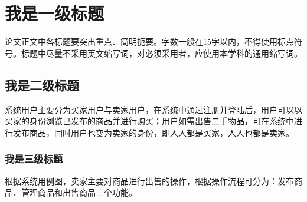 
\chapter{我是一级标题}
论文正文中各标题要突出重点、简明扼要。字数一般在15字以内，不得使用标点符号。标题中尽量不采用英文缩写词，对必须采用者，应使用本学科的通用缩写词。

\section{我是二级标题}
系统用户主要分为买家用户与卖家用户，在系统中通过注册并登陆后，用户可以以买家的身份浏览已发布的商品并进行购买；用户如需出售二手物品，可在系统中进行发布商品，同时用户也变为卖家的身份，即人人都是买家，人人也都是卖家。
\subsection{我是三级标题}
根据系统用例图，卖家主要对商品进行出售的操作，根据操作流程可分为：发布商品、管理商品和出售商品三个功能。
